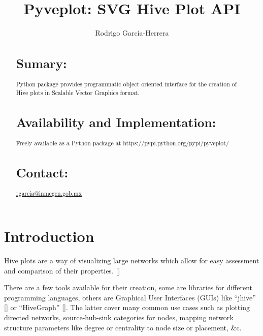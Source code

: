 \documentclass{bioinfo}
\begin{document}

\title[short Title]{Pyveplot: SVG Hive Plot API}
\author[]{Rodrigo Garc\'ia-Herrera}
\address{Department of Bioinformatics, National Institute of Genomic
  Medicine, Mexico}



\maketitle

\begin{abstract}

\section{Sumary:}
Python package provides programmatic object oriented interface for the
creation of Hive plots in Scalable Vector Graphics format.
\section{Availability and Implementation:}
Freely available as a Python package at
https://pypi.python.org/pypi/pyveplot/

\section{Contact:} \href{rgarcia@inmegen.gob.mx}{rgarcia@inmegen.gob.mx}
\end{abstract}

\section{Introduction}

Hive plots are a way of visualizing large networks which allow
for easy assessment and comparison of their properties.
[\cite{krzywinski2012hive}]

There are a few tools available for their creation, some are libraries
for different programming languages, others are Graphical User
Interfaces (GUIs) like ``jhive'' [\cite{jhive}] or ``HiveGraph''
[\cite{hivegraph}]. The latter cover many common use cases such as
plotting directed networks, source-hub-sink categories for nodes,
mapping network structure parameters like degree or centrality to node
size or placement, \&c.
\end{document}
